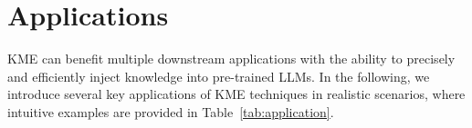 \documentclass[acmsmall, screen]{acmart}
\begin{document}

\section{Applications}\label{sec:task}

KME can benefit multiple downstream applications with the ability to precisely and efficiently inject knowledge into pre-trained LLMs. In the following, we introduce several key applications of KME techniques in realistic scenarios, where intuitive examples are provided in Table~\ref{tab:application}.

\end{document}
